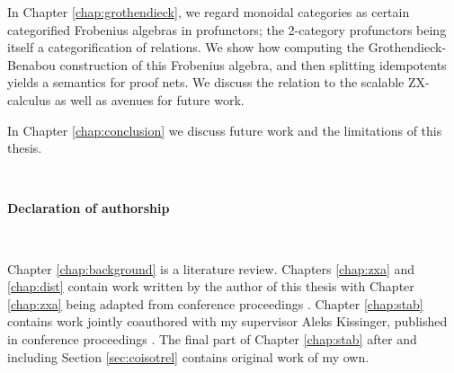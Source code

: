 \documentclass[12pt]{ociamthesis}  %
\begin{document}
In Chapter \ref{chap:grothendieck}, we regard monoidal categories as certain categorified Frobenius algebras in profunctors; the 2-category profunctors being itself a categorification of relations.  We show how computing the Grothendieck-Benabou construction of this Frobenius algebra, and then splitting idempotents yields a semantics for proof nets.  We discuss the relation to the scalable ZX-calculus as well as avenues for future work.

In Chapter \ref{chap:conclusion} we discuss future work and the limitations of this thesis.


%
%
%
%

\

{\bf \large  Declaration of authorship}

\

Chapter \ref{chap:background} is a literature review.  Chapters \ref{chap:zxa} and \ref{chap:dist} contain work written  by the author of this thesis with Chapter \ref{chap:zxa} being adapted from conference proceedings \cite{zxa}.  Chapter \ref{chap:stab} contains work jointly coauthored with my supervisor Aleks Kissinger, published in conference proceedings \cite{lagrel}.  The final part of Chapter  \ref{chap:stab} after and including Section \ref{sec:coisotrel} contains original work of my own.
\end{document}
